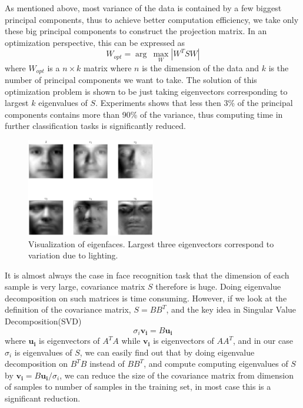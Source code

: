 \documentclass[conference]{IEEEtran}
\begin{document}
As mentioned above, most variance of the data is contained by a few biggest principal components, thus to achieve better computation efficiency, we take only these big principal components to construct the projection matrix. In an optimization perspective, this can be expressed as
\begin{equation}
	W_{opt}=\arg\: \max_W |W^TSW|
\end{equation}
where $W_{opt}$ is a $n\times k$ matrix where $n$ is the dimension of the data and $k$ is the number of principal components we want to take. The solution of this optimization problem is shown to be just taking eigenvectors corresponding to largest $k$ eigenvalues of $S$. Experiments shows that less then 3\% of the principal components contains more than 90\% of the variance, thus computing time in further classification tasks is significantly reduced.
\begin{figure}[htbp]
	\includegraphics[width=0.5\textwidth]{eigenface}
	\caption{Visualization of eigenfaces. Largest three eigenvectors correspond to variation due to lighting.}
	\label{eigenface}
\end{figure}

It is almost always the case in face recognition task that the dimension of each sample is very large, covariance matrix $S$ therefore is huge. Doing eigenvalue decomposition on such matrices is time consuming. However, if we look at the definition of the covariance matrix, $S=BB^T$, and the key idea in Singular Value Decomposition(SVD)
\begin{equation}
	 \sigma_i \bm{v_i}=B\bm{u_i}
\end{equation}
where $\bm{u_i}$ is eigenvectors of $A^TA$ while $\bm{v_i}$ is eigenvectors of $AA^T$, and in our case $\sigma_i$ is eigenvalues of $S$, we can easily find out that by doing eigenvalue decomposition on $B^TB$ instead of $BB^T$, and compute computing eigenvalues of $S$ by $\bm{v_i}=B\bm{u_i}/\sigma_i$, we can reduce the size of the covariance matrix from dimension of samples to number of samples in the training set, in most case this is a significant reduction.
\end{document}
